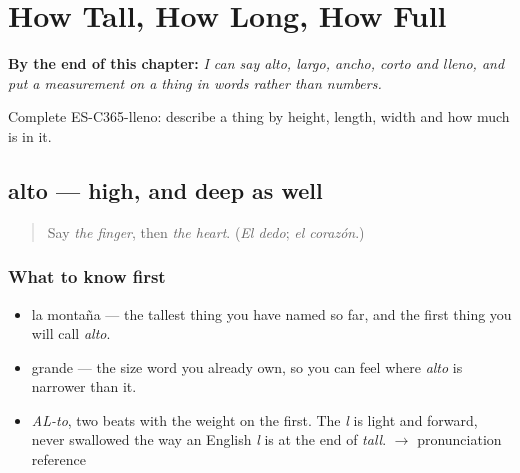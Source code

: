 
\chapter{How Tall, How Long, How Full}
\label{ch:alto-y-largo}

\begin{chapteropening}
\textbf{By the end of this chapter:} \emph{I can say alto, largo, ancho, corto and lleno, and put a measurement on a thing in words rather than numbers.}

Complete ES-C365-lleno: describe a thing by height, length, width and how much is in it.
\end{chapteropening}

\section[alto]{alto — high, and deep as well}

\label{lesson:ES-C365-alto}



\begin{quote}
Say \emph{the finger}, then \emph{the heart}. (\emph{El dedo}; \emph{el corazón}.)
\end{quote}

\subsection*{What to know first}
\begin{itemize}
\raggedright
  \item la montaña — the tallest thing you have named so far, and the first thing you will call \emph{alto}.
  \item grande — the size word you already own, so you can feel where \emph{alto} is narrower than it.
\end{itemize}

\begin{sounds}
\begin{itemize}
\raggedright
  \item \emph{AL-to}, two beats with the weight on the first. The \emph{l} is light and forward, never swallowed the way an English \emph{l} is at the end of \emph{tall}. $\to$ pronunciation reference
\end{itemize}
\end{sounds}

